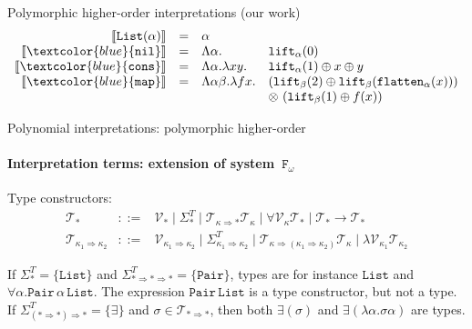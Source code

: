 \documentclass[10pt,presentation,color=names]{beamer}
\newcommand{\Fomega}{\mathtt{F}_\omega}
\newcommand{\arrkind}{\Rightarrow}
\newcommand{\arrtype}{\rightarrow}
\newcommand{\flatten}{\mathtt{flatten}}
\newcommand{\lift}{\mathtt{lift}}
\newcommand{\typeinterpret}[1]{\llbracket #1 \rrbracket}
\newcommand{\interpret}[1]{\llbracket #1 \rrbracket}
\newcommand{\Tc}{\mathcal{T}}
\newcommand{\Vc}{\mathcal{V}}
\newcommand{\symb}[1]{\textcolor{blue}{\mathtt{#1}}}
\newcommand{\List}{\mathtt{List}}
\newcommand{\Pair}{\mathtt{Pair}}
\newcommand{\nil}{\symb{nil}}
\newcommand{\cons}{\symb{cons}}
\newcommand{\map}{\symb{map}}
\begin{document}
\begin{frame}{Polymorphic higher-order interpretations (our work)}
\[
\begin{array}{rcll}
\typeinterpret{\List(\alpha)} & = & \alpha \\
\interpret{\nil} & = & \Lambda \alpha. & \lift_\alpha(0) \\
\interpret{\cons} & = & \Lambda \alpha.\lambda xy. & \lift_\alpha(1) \oplus x \oplus y \\
\interpret{\map} & = & \Lambda \alpha\beta.\lambda f x. & (\lift_\beta(2) \oplus \lift_\beta(\flatten_\alpha(x))) \\
  & & & \otimes\ (\lift_\beta(1) \oplus f(x)) \\
\end{array}
\]
\end{frame}


\begin{frame}{Polynomial interpretations: polymorphic higher-order}
  \framesubtitle{Interpretation terms: extension of system~$\Fomega$}
  Type constructors:
  \[
  \begin{array}{rcl}
    \Tc_{*} &::=& \Vc_{*} \mid \Sigma^T_{*} \mid \Tc_{\kappa\arrkind
      *}\Tc_{\kappa} \mid \forall\Vc_\kappa\Tc_* \mid
    \Tc_*\arrtype\Tc_* \\ \Tc_{\kappa_1\arrkind\kappa_2} &::=&
    \Vc_{\kappa_1\arrkind\kappa_2} \mid
    \Sigma^T_{\kappa_1\arrkind\kappa_2} \mid
    \Tc_{\kappa\arrkind(\kappa_1\arrkind\kappa_2)}\Tc_{\kappa} \mid
    \lambda \Vc_{\kappa_1} \Tc_{\kappa_2}
  \end{array}
  \]
  \pause
  \begin{example}
  If $\Sigma^T_{*} = \{ \List \}$ and $\Sigma^T_{* \arrkind * \arrkind
    *} = \{ \Pair \}$, types are for instance $\List$ and $\forall
  \alpha.\Pair\,\alpha\,\List$.  The expression $\Pair\,\List$ is a
  type constructor, but not a type.  If $\Sigma^T_{(* \arrkind *)
    \arrkind *} = \{ \exists \}$ and $\sigma \in \Tc_{* \arrkind *}$,
  then both $\exists(\sigma)$ and $\exists (\lambda
  \alpha.\sigma\alpha)$ are types.
  \end{example}
\end{frame}
\end{document}

